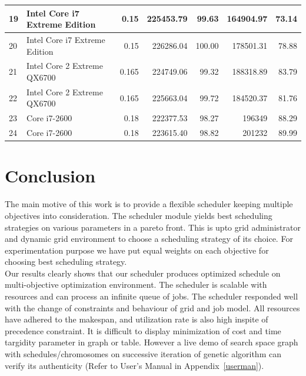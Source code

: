 \begin{table}[!h]
{\begin{tabular}{|l|l|r|r|r|r|r|}
19	&	Intel Core i7 Extreme Edition	&	0.15	&	225453.79	&	99.63	&	164904.97	&	73.14	\\	\hline
20	&	Intel Core i7 Extreme Edition	&	0.15	&	226286.04	&	100.00	&	178501.31	&	78.88	\\	\hline
21	&	Intel Core 2 Extreme QX6700	&	0.165	&	224749.06	&	99.32	&	188318.89	&	83.79	\\	\hline
22	&	Intel Core 2 Extreme QX6700	&	0.165	&	225663.04	&	99.72	&	184520.37	&	81.76	\\	\hline
23	&	Core i7-2600	&	0.18	&	222377.53	&	98.27	&	196349	&	88.29	\\	\hline
24	&	Core i7-2600	&	0.18	&	223615.40	&	98.82	&	201232	&	89.99	\\	\hline
\end{tabular}
}
\label{case5das24}
\end{table}


\section{Conclusion}
The main motive of this work is to provide a flexible scheduler keeping multiple objectives into consideration. The scheduler module yields best scheduling strategies on various parameters in a pareto front. This is upto grid administrator and dynamic grid environment to choose a scheduling strategy of its choice. For experimentation purpose we have put equal weights on each objective for choosing best scheduling strategy. \\
Our results clearly shows that our scheduler produces optimized schedule on multi-objective optimization environment. The scheduler is scalable with resources and can process an infinite queue of jobs. The scheduler responded well with the change of constraints and behaviour of grid and job model. All resources have adhered to the makespan, and utilization rate is also high inspite of precedence constraint. It is difficult to display minimization of cost and time targidity parameter in graph or table. However a live demo of search space graph with schedules/chromosomes on successive iteration of genetic algorithm can verify its authenticity (Refer to User's Manual in Appendix~\ref{userman}). 
\\
